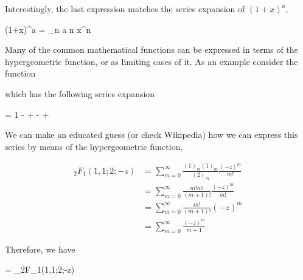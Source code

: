 Interestingly, the last expression matches the series expansion of $(1+x)^a$,

\bee
(1+x)^a = \sum_n {a \choose n} x^n
\eee

Many of the common mathematical functions can be expressed in terms of the hypergeometric function, or as limiting cases of it. As an example consider the function

\bee
{}
\eee

which has the following series expansion

\bee
{} = 1 -  +  -  +  \mp \cdots
\eee

We can make an educated guess (or check Wikipedia) how we can express this series by means of the hypergeometric function,

\begin{align*}
_2F_1(1,1;2;-z) &= \sum_{m=0}^\infty \frac{(1)_m (1)_m}{(2)_m} \frac{(-z)^m}{m!} \\
&= \sum_{m=0}^\infty \frac{m! m!}{(m+1)!} \frac{(-z)^m}{m!} \\
&= \sum_{m=0}^\infty \frac{m!}{(m+1)!} (-z)^m \\
&= \sum_{m=0}^\infty \frac{(-z)^m}{m+1}
\end{align*}

Therefore, we have

\bee
{} = _2F_1(1,1;2;-z)
\eee



